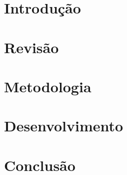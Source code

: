\documentclass[mestrado, pre-defesa, spanish, english, brazil]{../packages/icmc}
\begin{document}
\textual

\chapter{Introdução}
\label{chapter:introducao}


\chapter{Revisão}
\label{chapter:revisao}


\chapter{Metodologia}
\label{chapter:metodologia}


\chapter{Desenvolvimento}
\label{chapter:desenvolvimento}


\chapter{Conclusão}
\label{chapter:conclusao}


% 

\postextual





\glsaddall
\printglossaries
\end{document}
